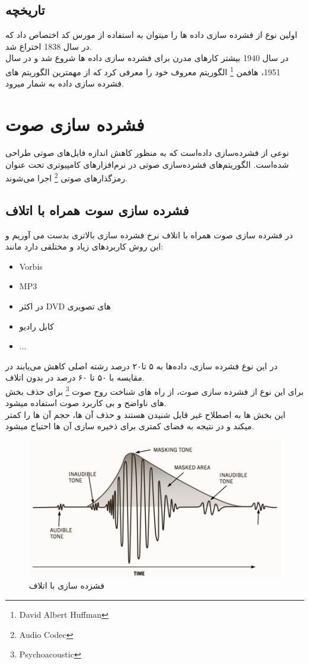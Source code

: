 \subsection{تاریخچه}
اولین نوع از فشرده سازی داده ها را میتوان به استفاده از مورس کد اختصاص داد که در سال 
1838 
اختراع شد. 
\\
در سال 1940 بیشتر کارهای مدرن برای فشرده سازی داده ها شروع شد و 
در سال 1951، هافمن 
\footnote{David Albert Huffman} 
الگوریتم معروف خود را معرفی کرد که از مهمترین الگوریتم های فشرده سازی داده به شمار میرود.


\section{فشرده سازی صوت}
نوعی از فشرده‌سازی داده‌است که به منظور کاهش اندازه فایل‌های صوتی طراحی شده‌است. الگوریتم‌های فشرده‌سازی صوتی در نرم‌افزارهای کامپیوتری تحت عنوان رمزگذارهای صوتی
\footnote{Audio Codec}
اجرا می‌شوند.
\subsection{فشرده سازی سوت همراه با اتلاف}
در فشرده سازی صوت همراه با اتلاف نرخ فشرده سازی بالاتری بدست می آوریم و این روش
کاربردهای زیاد و مختلقی دارد مانند:

\begin{itemize}
    \item    
    Vorbis
    \item
    MP3
    \item
    در اکثر DVD های تصویری
    \item
    کابل رادیو
    \item
    ...
\end{itemize}
در این نوع فشرده سازی، داده‌ها به ۵ تا۲۰ درصد رشته اصلی کاهش می‌یابند در مقایسه با ۵۰ تا ۶۰ درصد در بدون اتلاف.
\\
برای این نوع از فشرده سازی صوت، از راه های شناخت روح صوت
\footnote{Psychoacoustic}
برای حذف بخش های ناواضح و بی کاربرد صوت استفاده میشود. 
\\
این بخش ها به اصطلاح غیر قابل شنیدن هستند و حذف آن ها، حجم آن ها را کمتر میکند و در نتیجه به فضای کمتری برای ذخیره سازی آن ها احتیاج میشود.
\begin{figure}[H]
    \centering
    \includegraphics[width=0.5\linewidth]{images/lossy1.png}
    \caption{فشزده سازی با اتلاف}
    \label{fig:mesal1}
\end{figure}

